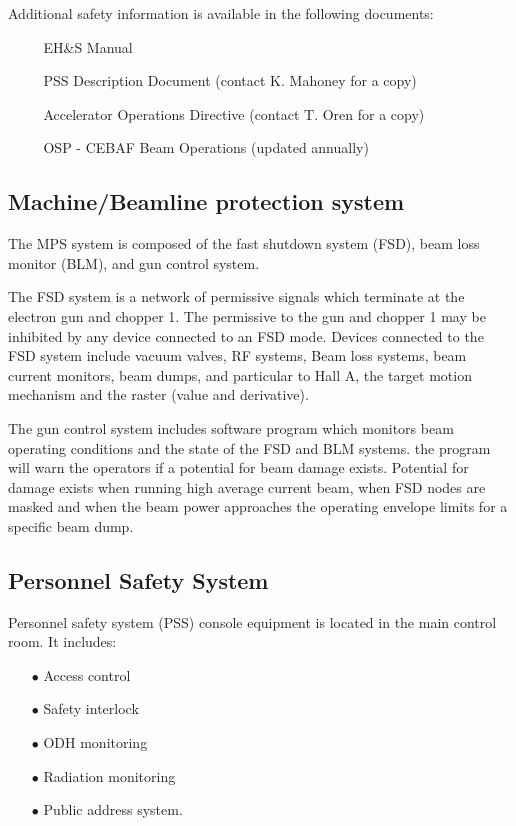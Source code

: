 Additional safety information is available in the following documents:

\begin{itemize}
\item[~] EH\&S Manual
\item[~] PSS Description Document (contact K. Mahoney for a copy)
\item[~] Accelerator Operations Directive (contact T. Oren for a copy)
\item[~] OSP - CEBAF Beam Operations (updated annually)
\end{itemize}

\subsection{ Machine/Beamline protection system}

The MPS system is composed of the fast shutdown system (FSD), beam loss 
monitor (BLM), and gun control system.

The FSD system is a network of permissive signals which terminate at the 
electron gun and chopper 1. The permissive to the gun and chopper
1 may be inhibited by any device connected to an FSD mode. Devices connected to the 
FSD system include vacuum valves, RF systems, Beam loss systems, beam current 
monitors, beam dumps, and particular to Hall A, the target motion mechanism 
and the raster (value and derivative).

The gun control system includes software program which monitors beam 
operating conditions and the state of the FSD and BLM systems. the program 
will warn the operators if a potential for beam damage exists. Potential for 
damage exists when running high average current beam, when FSD nodes are 
masked and when the beam power approaches the operating envelope limits for a 
specific beam dump.

\subsection{ Personnel Safety System}
 
Personnel safety system (PSS) console equipment is located in the main 
control room. It includes:

\begin{itemize}
\item[$\bullet$] Access control
\item[$\bullet$]Safety interlock
\item[$\bullet$]ODH monitoring
\item[$\bullet$]Radiation monitoring
\item[$\bullet$]Public address system.
\end{itemize}

